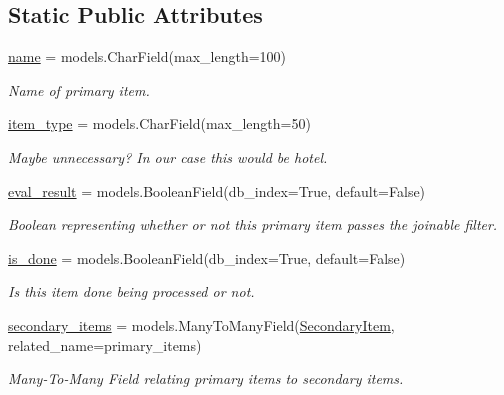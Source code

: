 \subsection*{Static Public Attributes}
\begin{DoxyCompactItemize}
\item 
\mbox{\hyperlink{classjoinapp_1_1models_1_1items_1_1_primary_item_ab74e6bf80237ddc4109968cedc58c151}{name}} = models.\+Char\+Field(max\+\_\+length=100)
\begin{DoxyCompactList}\small\item\em Name of primary item. \end{DoxyCompactList}\item 
\mbox{\hyperlink{classjoinapp_1_1models_1_1items_1_1_primary_item_a2679318a14061852e50df3c6e4e42f62}{item\+\_\+type}} = models.\+Char\+Field(max\+\_\+length=50)
\begin{DoxyCompactList}\small\item\em Maybe unnecessary? In our case this would be hotel. \end{DoxyCompactList}\item 
\mbox{\hyperlink{classjoinapp_1_1models_1_1items_1_1_primary_item_ad3d4511625ae766aa7b27b78372da59a}{eval\+\_\+result}} = models.\+Boolean\+Field(db\+\_\+index=True, default=False)
\begin{DoxyCompactList}\small\item\em Boolean representing whether or not this primary item passes the joinable filter. \end{DoxyCompactList}\item 
\mbox{\hyperlink{classjoinapp_1_1models_1_1items_1_1_primary_item_adb552c356f3128144a850af54619b087}{is\+\_\+done}} = models.\+Boolean\+Field(db\+\_\+index=True, default=False)
\begin{DoxyCompactList}\small\item\em Is this item done being processed or not. \end{DoxyCompactList}\item 
\mbox{\hyperlink{classjoinapp_1_1models_1_1items_1_1_primary_item_a0cd125858c0f77f976fcb2a3c626392f}{secondary\+\_\+items}} = models.\+Many\+To\+Many\+Field(\mbox{\hyperlink{classjoinapp_1_1models_1_1items_1_1_secondary_item}{Secondary\+Item}}, related\+\_\+name=\textquotesingle{}primary\+\_\+items\textquotesingle{})
\begin{DoxyCompactList}\small\item\em Many-\/\+To-\/\+Many Field relating primary items to secondary items. \end{DoxyCompactList}\item 

\end{DoxyCompactItemize}
